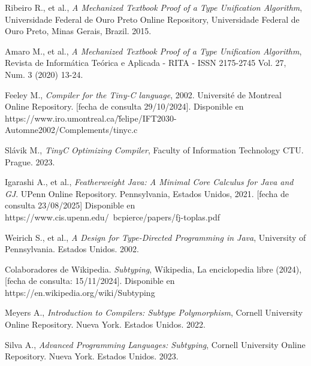 \begin{thebibliography}{11}
   
    \bibitem{}
    \label{sec:124}
    \hypertarget{124}{}
    Ribeiro R., et al., \textit{A Mechanized Textbook Proof of a Type Unification Algorithm},  Universidade Federal de Ouro Preto Online Repository, Universidade Federal de Ouro Preto, Minas Gerais, Brazil. 2015.

    \bibitem{}
    \label{sec:125}
    \hypertarget{125}{}
    Amaro M., et al., \textit{A Mechanized Textbook Proof of a Type Unification Algorithm},  Revista de Informática Teórica e Aplicada - RITA - ISSN 2175-2745  Vol. 27, Num. 3 (2020) 13-24.

    \bibitem{}
    \label{sec:126}
    \hypertarget{126}{}
     Feeley M., \textit{Compiler for the Tiny-C language}, 2002. Université de Montreal Online Repository.  [fecha de consulta 29/10/2024]. Disponible en https://www.iro.umontreal.ca/\~felipe/IFT2030-Automne2002/Complements/tinyc.c

    \bibitem{}
    \label{sec:127}
    \hypertarget{127}{}
     Slávik M., \textit{TinyC Optimizing Compiler},  Faculty of Information Technology CTU. Prague. 2023.

 \bibitem{}
    \label{sec:128}
    \hypertarget{128}{}
	Igarashi A., et al., \textit{Featherweight Java: A Minimal Core Calculus for Java and GJ}.  UPenn Online Repository.  Pennsylvania, Estados Unidos, 2021.  [fecha de consulta 23/08/2025] Disponible en https://www.cis.upenn.edu/~bcpierce/papers/fj-toplas.pdf 

    \bibitem{}
    \label{sec:129}
    \hypertarget{129}{}
    Weirich S., et al., \textit{A Design for Type-Directed Programming in Java},  University of Pennsylvania. Estados Unidos. 2002.

    \bibitem{}
    \label{sec:130}
    \hypertarget{130}{}
    Colaboradores de Wikipedia. \textit{Subtyping},  Wikipedia, La enciclopedia libre (2024), [fecha de consulta: 15/11/2024]. Disponible en https://en.wikipedia.org/wiki/Subtyping

    \bibitem{}
    \label{sec:131}
    \hypertarget{131}{}
    Meyers A., \textit{Introduction to Compilers: Subtype Polymorphism}, Cornell University Online Repository. Nueva York. Estados Unidos. 2022.

    \bibitem{}
    \label{sec:132}
    \hypertarget{132}{}
    Silva A., \textit{Advanced Programming Languages: Subtyping}, Cornell University Online Repository. Nueva York. Estados Unidos. 2023.


\end{thebibliography}
